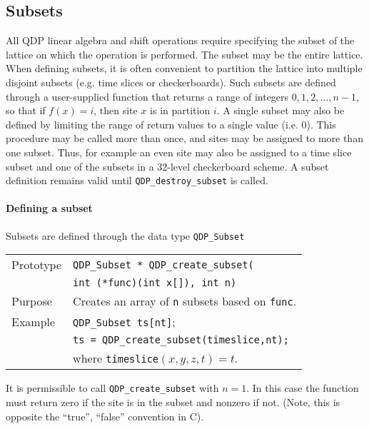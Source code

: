 \documentclass{article}
\begin{document}
\subsection{Subsets}

All QDP linear algebra and shift operations require specifying the
subset of the lattice on which the operation is performed.  The subset
may be the entire lattice.  When defining subsets, it is often
convenient to partition the lattice into multiple disjoint subsets
(e.g. time slices or checkerboards).  Such subsets are defined through
a user-supplied function that returns a range of integers
$0,1,2,\ldots{},n-1$, so that if $f(x) = i$, then site $x$ is in
partition $i$.  A single subset may also be defined by limiting the
range of return values to a single value (i.e. 0).  This procedure may
be called more than once, and sites may be assigned to more than one
subset.  Thus, for example an even site may also be assigned to a time
slice subset and one of the subsets in a 32-level checkerboard scheme.
A subset definition remains valid until \verb|QDP_destroy_subset| is
called.

\paragraph{Defining a subset}

Subsets are defined through the data type \verb|QDP_Subset|

\begin{flushleft}
  \begin{tabular}{|l|l|}
  \hline
  Prototype      & \verb|QDP_Subset * QDP_create_subset(|\\
                 & \verb|int (*func)(int x[]), int n)|\\
    \hline
Purpose        & Creates an array of \verb|n| subsets based on \verb|func|.\\
    \hline
Example  & \verb|QDP_Subset ts[nt]|; \\
         & \verb|ts = QDP_create_subset(timeslice,nt);| \\
         & where {\tt timeslice}$(x,y,z,t) = t$. \\
   \hline
  \end{tabular}
\end{flushleft}
%
It is permissible to call \verb|QDP_create_subset| with $n =
1$.  In this case the function must return zero if the site is in the
subset and nonzero if not.  (Note, this is opposite the ``true'',
``false'' convention in C).
\end{document}

